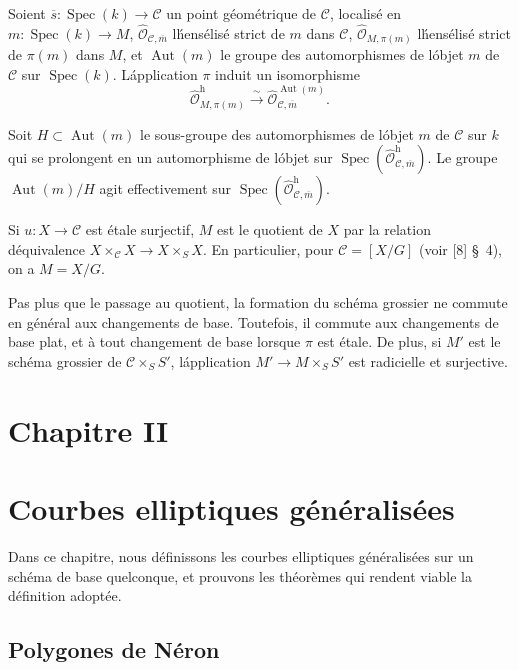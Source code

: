 \documentclass{amsart}
\theoremstyle{plain}
\theoremstyle{remark}
\DeclareMathOperator{\Aut}{Aut}
\DeclareMathOperator{\Spec}{Spec}
\newcommand{\cO}{\mathcal{O}}
\begin{document}
Soient $\overline{s}: \Spec(k) \to \mathscr{C}$ un point g\'eom\'etrique de $\mathscr{C}$, localis\'e en
$m: \Spec(k) \to M$, $\widehat{\cO}_{\mathscr{C}, \overline{m}}$ l\'hens\'elis\'e strict de $m$
dans $\mathscr{C}$, $\widehat{\cO}_{M, \pi(m)}$ l\'hens\'elis\'e strict de $\pi(m)$ dans $M$, et
$\Aut(m)$ le groupe des automorphismes de l\'objet $m$ de $\mathscr{C}$ sur $\Spec(k)$.
L\'application $\pi$ induit un isomorphisme
\begin{equation}
\widehat{\cO}_{M, \pi(m)}^{\text{h}} \xrightarrow{\sim}
\widehat{\cO}_{\mathscr{C}, \overline{m}}^{\Aut(m)}.
\end{equation}

Soit $H \subset \Aut(m)$ le sous-groupe des automorphismes de l\'objet $m$ de
$\mathscr{C}$ sur $k$ qui se prolongent en un automorphisme de l\'objet sur
$\Spec(\widehat{\cO}_{\mathscr{C}, \overline{m}}^{\text{h}})$. Le groupe $\Aut(m)/H$ agit
effectivement sur $\Spec(\widehat{\cO}_{\mathscr{C}, \overline{m}}^{\text{h}})$.

Si $u: X \to \mathscr{C}$ est \'etale surjectif, $M$ est le quotient de $X$ par la relation
d\'equivalence $X \times_{\mathscr{C}} X \to X \times_S X$. En particulier, pour
$\mathscr{C} = [X/G]$ (voir [8] \S~4), on a $M = X/G$.

Pas plus que le passage au quotient, la formation du sch\'ema grossier ne commute en
g\'en\'eral aux changements de base. Toutefois, il commute aux changements de base plat,
et \`a tout changement de base lorsque $\pi$ est \'etale. De plus, si $M'$ est le sch\'ema
grossier de $\mathscr{C} \times_S S'$, l\'application $M' \to M \times_S S'$ est radicielle et
surjective.

\newpage
\newpage
\section*{Chapitre II}
\section{Courbes elliptiques g\'en\'eralis\'ees}

Dans ce chapitre, nous d\'efinissons les courbes elliptiques g\'en\'eralis\'ees sur un
sch\'ema de base quelconque, et prouvons les th\'eor\`emes qui rendent viable la
d\'efinition adopt\'ee.

\subsection{Polygones de N\'eron}
\end{document}
